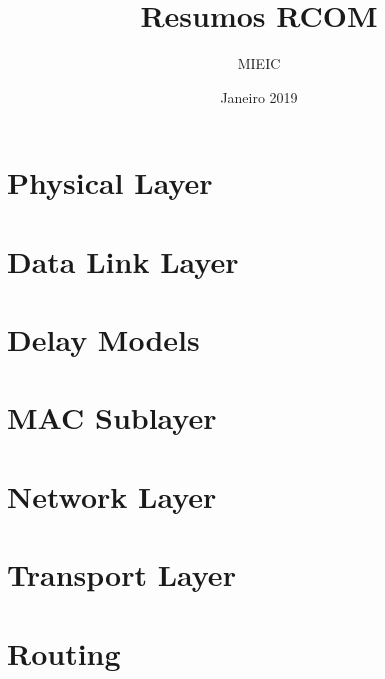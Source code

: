 \documentclass{article}
\title{Resumos RCOM}
\author{MIEIC}
\date{Janeiro 2019}
\begin{document}
  
\maketitle

\tableofcontents

\section{Physical Layer}


 
\section{Data Link Layer}



\section{Delay Models}
 


\section{MAC Sublayer}
 


\section{Network Layer}
 


\section{Transport Layer}
 


\section{Routing}
 

\end{document}
